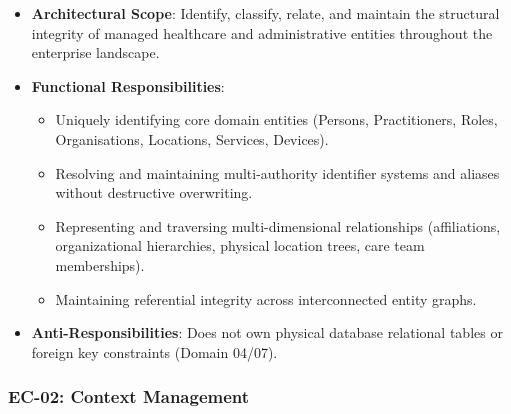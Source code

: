 \begin{itemize}

\item
\textbf{Architectural Scope}: Identify, classify, relate, and maintain the structural integrity of managed healthcare and administrative entities throughout the enterprise landscape.



\item
\textbf{Functional Responsibilities}:


\begin{itemize}

\item
Uniquely identifying core domain entities (Persons, Practitioners, Roles, Organisations, Locations, Services, Devices).



\item
Resolving and maintaining multi-authority identifier systems and aliases without destructive overwriting.



\item
Representing and traversing multi-dimensional relationships (affiliations, organizational hierarchies, physical location trees, care team memberships).



\item
Maintaining referential integrity across interconnected entity graphs.



\end{itemize}


\item
\textbf{Anti-Responsibilities}: Does not own physical database relational tables or foreign key constraints (Domain 04/\allowbreak{}07).



\end{itemize}
\label{rad:enterprise:112}
\subsubsection*{EC-02: Context Management}
\label{rad:enterprise:113}

